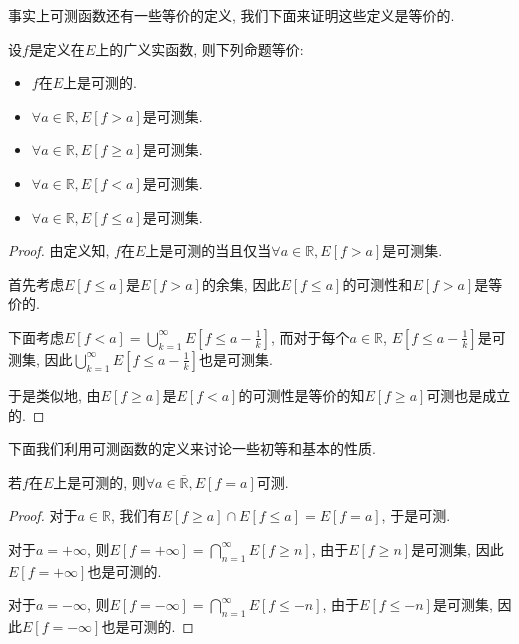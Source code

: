 \documentclass[theorem=false,mathfont=none,openany,sub3section]{easybook}
\begin{document}
事实上可测函数还有一些等价的定义, 我们下面来证明这些定义是等价的.\par

\begin{theorem}
  设$f$是定义在$E$上的广义实函数, 则下列命题等价:\par
  \begin{itemize}
    \item $f$在$E$上是可测的.
    \item $\forall a\in \mathbb{R}, E[f>a]$是可测集.
    \item $\forall a\in \mathbb{R}, E[f\geqslant a]$是可测集.
    \item $\forall a\in \mathbb{R}, E[f<a]$是可测集.
    \item $\forall a\in \mathbb{R}, E[f\leqslant a]$是可测集.
  \end{itemize}
\end{theorem}

\begin{proof}
  由定义知, $f$在$E$上是可测的当且仅当$\forall a\in \mathbb{R}, E[f>a]$是可测集.\par
  首先考虑$E[f\leqslant a]$是$E[f>a]$的余集, 因此$E[f\leqslant a]$的可测性和$E[f>a]$是等价的.\par
  下面考虑$E[f<a]=\bigcup_{k=1}^{\infty}E[f\leqslant a-\frac{1}{k}]$, 而对于每个$a\in \mathbb{R}$, $E[f\leqslant a-\frac{1}{k}]$是可测集, 因此$\bigcup_{k=1}^{\infty}E[f\leqslant a-\frac{1}{k}]$也是可测集.\par
  于是类似地, 由$E[f\geqslant a]$是$E[f<a]$的可测性是等价的知$E[f\geqslant a]$可测也是成立的.\par
\end{proof}

下面我们利用可测函数的定义来讨论一些初等和基本的性质.\par

\begin{proposition}
  若$f$在$E$上是可测的, 则$\forall a\in \overline{\mathbb{R}}, E[f=a]$可测.\par
\end{proposition}

\begin{proof}
  对于$a \in \mathbb{R}$, 我们有$E[f\geqslant a]\cap E[f\leqslant a]=E[f=a]$, 于是可测.\par
  对于$a = +\infty$, 则$E[f=+\infty]=\bigcap_{n=1}^{\infty}E[f\geqslant n]$, 由于$E[f\geqslant n]$是可测集, 因此$E[f=+\infty]$也是可测的.\par
  对于$a = -\infty$, 则$E[f=-\infty]=\bigcap_{n=1}^{\infty}E[f\leqslant -n]$, 由于$E[f\leqslant -n]$是可测集, 因此$E[f=-\infty]$也是可测的.\par
\end{proof}
\end{document}
